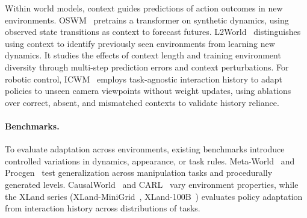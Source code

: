 Within world models, context guides predictions of action outcomes in new environments.
OSWM~\cite{ferreira2024oswm} pretrains a transformer on synthetic dynamics, using observed state transitions as context to forecast futures.
L2World~\cite{wang2026context} distinguishes using context to identify previously seen environments from learning new dynamics.
It studies the effects of context length and training environment diversity through multi-step prediction errors and context perturbations.
For robotic control, ICWM~\cite{wang2026icwm} employs task-agnostic interaction history to adapt policies to unseen camera viewpoints without weight updates, using ablations over correct, absent, and mismatched contexts to validate history reliance.

\paragraph{Benchmarks.}
To evaluate adaptation across environments, existing benchmarks introduce controlled variations in dynamics, appearance, or task rules.
Meta-World~\cite{yu2020metaworld} and Procgen~\cite{cobbe2020procgen} test generalization across manipulation tasks and procedurally generated levels.
CausalWorld~\cite{ahmed2021causalworld} and CARL~\cite{benjamins2023context} vary environment properties, while the XLand series (XLand-MiniGrid~\cite{nikulin2024xland}, XLand-100B~\cite{nikulin2025xland100b}) evaluates policy adaptation from interaction history across distributions of tasks.

